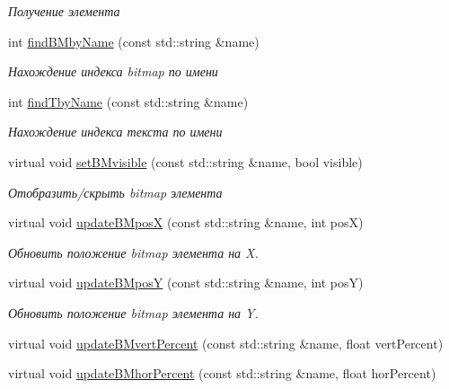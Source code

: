 \begin{DoxyCompactItemize}
\begin{DoxyCompactList}\small\item\em Получение элемента \end{DoxyCompactList}\item 
int \hyperlink{class_interface_element_class_aa878a2296a5fe72fb7a92e833f276961}{find\+B\+Mby\+Name} (const std\+::string \&name)
\begin{DoxyCompactList}\small\item\em Нахождение индекса bitmap по имени \end{DoxyCompactList}\item 
int \hyperlink{class_interface_element_class_a2d7805e3c6f80068b76618e3ad43f31f}{find\+Tby\+Name} (const std\+::string \&name)
\begin{DoxyCompactList}\small\item\em Нахождение индекса текста по имени \end{DoxyCompactList}\item 
virtual void \hyperlink{class_interface_element_class_a2148ae1a7b93246c9e89724340347de0}{set\+B\+Mvisible} (const std\+::string \&name, bool visible)
\begin{DoxyCompactList}\small\item\em Отобразить/скрыть bitmap элемента \end{DoxyCompactList}\item 
virtual void \hyperlink{class_interface_element_class_aefde245f4498eaed30056ba83515b3e7}{update\+B\+MposX} (const std\+::string \&name, int posX)
\begin{DoxyCompactList}\small\item\em Обновить положение bitmap элемента на X. \end{DoxyCompactList}\item 
virtual void \hyperlink{class_interface_element_class_aef92fb02c9e353893485939eaff5f8ee}{update\+B\+MposY} (const std\+::string \&name, int posY)
\begin{DoxyCompactList}\small\item\em Обновить положение bitmap элемента на Y. \end{DoxyCompactList}\item 
virtual void \hyperlink{class_interface_element_class_aaf28d020efdb4ff5ad334e6577198e59}{update\+B\+Mvert\+Percent} (const std\+::string \&name, float vert\+Percent)
\item 
virtual void \hyperlink{class_interface_element_class_a4891a40d50c2cdad0227bf4d45651f25}{update\+B\+Mhor\+Percent} (const std\+::string \&name, float hor\+Percent)

\end{DoxyCompactItemize}
